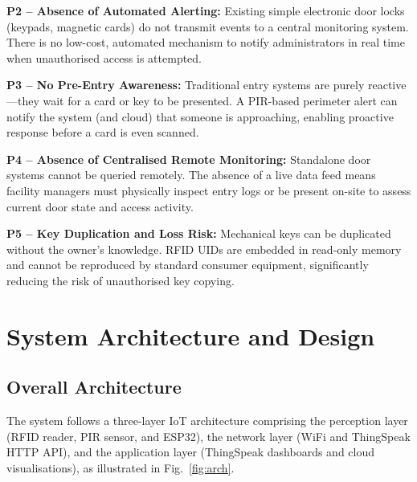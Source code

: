 \documentclass[12pt,a4paper]{article}
\begin{document}
\textbf{P2 -- Absence of Automated Alerting:}
Existing simple electronic door locks (keypads, magnetic cards)
do not transmit events to a central monitoring system. There is
no low-cost, automated mechanism to notify administrators in real
time when unauthorised access is attempted.

\textbf{P3 -- No Pre-Entry Awareness:}
Traditional entry systems are purely reactive---they wait for a card
or key to be presented. A PIR-based perimeter alert can notify the
system (and cloud) that someone is approaching, enabling proactive
response before a card is even scanned.

\textbf{P4 -- Absence of Centralised Remote Monitoring:}
Standalone door systems cannot be queried remotely. The absence of
a live data feed means facility managers must physically inspect
entry logs or be present on-site to assess current door state and
access activity.

\textbf{P5 -- Key Duplication and Loss Risk:}
Mechanical keys can be duplicated without the owner's knowledge.
RFID UIDs are embedded in read-only memory and cannot be
reproduced by standard consumer equipment, significantly reducing
the risk of unauthorised key copying.

\section{System Architecture and Design}
\label{sec:architecture}

\subsection{Overall Architecture}

The system follows a three-layer IoT architecture comprising
the perception layer (RFID reader, PIR sensor, and ESP32), the
network layer (WiFi and ThingSpeak HTTP API), and the application
layer (ThingSpeak dashboards and cloud visualisations), as
illustrated in Fig.~\ref{fig:arch}.
\end{document}
